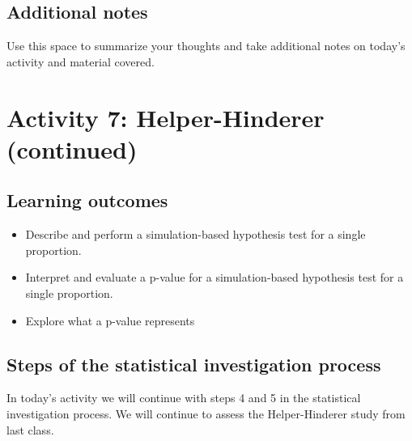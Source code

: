 \documentclass[
]{report}
\begin{document}
\subsection{Additional notes}\label{additional-notes-5}

Use this space to summarize your thoughts and take additional notes on today's activity and material covered.

\newpage

\section{Activity 7: Helper-Hinderer (continued)}\label{activity-7-helper-hinderer-continued}


\subsection{Learning outcomes}\label{learning-outcomes-6}

\begin{itemize}
\item
  Describe and perform a simulation-based hypothesis test for a single proportion.
\item
  Interpret and evaluate a p-value for a simulation-based hypothesis test for a single proportion.
\item
  Explore what a p-value represents
\end{itemize}

\subsection{Steps of the statistical investigation process}\label{steps-of-the-statistical-investigation-process-3}

In today's activity we will continue with steps 4 and 5 in the statistical investigation process. We will continue to assess the Helper-Hinderer study from last class.
\end{document}
